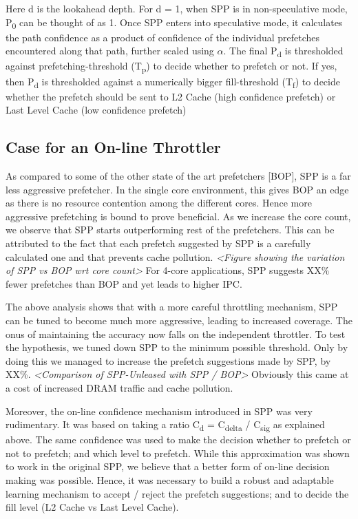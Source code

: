 \documentclass{sig-alternate}
\begin{document}
Here d is the lookahead depth. 
For d = 1, when SPP is in non-speculative mode, P\textsubscript{0} can be thought of as 1. 
Once SPP enters into speculative mode, it calculates the path confidence as a product of confidence of the individual prefetches encountered along that path, further scaled using $\alpha$. 
The final P\textsubscript{d} is thresholded against prefetching-threshold (T\textsubscript{p}) to decide whether to prefetch or not. 
If yes, then P\textsubscript{d} is thresholded against a numerically bigger fill-threshold (T\textsubscript{f}) to decide whether the prefetch should be sent to L2 Cache (high confidence prefetch) or Last Level Cache (low confidence prefetch)

\subsection{Case for an On-line Throttler}
As compared to some of the other state of the art prefetchers [BOP], SPP is a far less aggressive prefetcher. 
In the single core environment, this gives BOP an edge as there is no resource contention among the different cores. 
Hence more aggressive prefetching is bound to prove beneficial. 
As we increase the core count, we observe that SPP starts outperforming rest of the prefetchers. 
This can be attributed to the fact that each prefetch suggested by SPP is a carefully calculated one and that prevents cache pollution. 
\textit{<Figure showing the variation of SPP vs BOP wrt core count>} 
For 4-core applications, SPP suggests XX\% fewer prefetches than BOP and yet leads to higher IPC.

The above analysis shows that with a more careful throttling mechanism, SPP can be tuned to become much more aggressive, leading to increased coverage. 
The onus of maintaining the accuracy now falls on the independent throttler. 
To test the hypothesis, we tuned down SPP to the minimum possible threshold. 
Only by doing this we managed to increase the prefetch suggestions made by SPP, by XX\%. 
\textit{<Comparison of SPP-Unleased with SPP / BOP>}
Obviously this came at a cost of increased DRAM traffic and cache pollution. 

Moreover, the on-line confidence mechanism introduced in SPP was very rudimentary.
It was based on taking a ratio C\textsubscript{d} = C\textsubscript{delta} / C\textsubscript{sig} as explained above.
The same confidence was used to make the decision whether to prefetch or not to prefetch; and which level to prefetch.
While this approximation was shown to work in the original SPP, we believe that a better form of on-line decision making was possible.
Hence, it was necessary to build a robust and adaptable learning mechanism to accept / reject the prefetch suggestions; and to decide the fill level (L2 Cache vs Last Level Cache).
\end{document}
